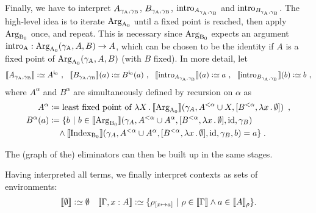 \documentclass{article}
\begin{document}
Finally, we have to interpret $A_{\gamma_{\mathrm{A}}, \gamma_{\mathrm{B}}}$, $B_{\gamma_{\mathrm{A}}, \gamma_{\mathrm{B}}}$,
$\text{intro}_{A_{\gamma_{\mathrm{A}}, \gamma_{\mathrm{B}}}}$ and $\text{intro}_{B_{\gamma_{\mathrm{A}}, \gamma_{\mathrm{B}}}}$.  The high-level
idea is to iterate $\text{Arg}_{\mathrm{A}_0}$ until a fixed point is reached, then apply
$\text{Arg}_{\mathrm{B}_0}$ once, and repeat. This is necessary since $\text{Arg}_{\mathrm{B}_0}$ expects an
argument $\text{intro}_{\mathrm{A}} : \text{Arg}_{\mathrm{A}_0}(\gamma_{\mathrm{A}}, A, B) \to A$, which can be chosen
to be the identity if $A$ is a fixed point of $\text{Arg}_{\mathrm{A}_0}(\gamma_{\mathrm{A}}, A, B)$
(with $B$ fixed). In more detail, let
\begin{gather*}
\sem{A_{\gammaAB}} \colonsimeq A^{\cardz} \enspace\! , \quad\!\!
\sem{B_{\gammaAB}}(a) \colonsimeq B^{\cardz}(a)\enspace\! , \quad\!\!
\sem{\intro{A_{\gammaAB}}}(a) \colonsimeq a \enspace\! ,\quad\!\!
\sem{\intro{B_{\gammaAB}}}(b) \colonsimeq b \enspace\! ,\\
\end{gather*} \vskip -0.5cm \noindent 
where $A^{\alpha}$ and $B^{\alpha}$ are
simultaneously defined by recursion on $\alpha$ as
\begin{align*}
  A^{\alpha} & \coloneqq  \text{least fixed point of }
       \lambda X\,.\, \llbracket \text{Arg}_{\mathrm{A}_0} \rrbracket(\gamma_A, A^{< \alpha} \cup X, [B^{< \alpha}, \lambda x\,.\,\emptyset]) \enspace ,\\
  B^{\alpha}(a) & \coloneqq \{b\ |\ b \in \llbracket \text{Arg}_{\mathrm{B}_0} \rrbracket(\gamma_A, A^{< \alpha} \cup A^{\alpha},
  [B^{< \alpha}, \lambda x\,.\,\emptyset], \text{id}, \gamma_B) \\
  & \quad \land \llbracket \text{Index}_{\mathrm{B}_0} \rrbracket(\gamma_A,
  A^{< \alpha} \cup A^{\alpha}, [B^{< \alpha}, \lambda x\,.\,\emptyset], \text{id}, \gamma_B, b) = a \}\enspace \hspace{-2.47968pt} .
\end{align*}

The (graph of the) eliminators can then be built up in the same
stages.

Having interpreted all terms, we finally interpret contexts as sets of environments:
\begin{align*}
  \llbracket \emptyset \rrbracket \mathrel{\mathop:}\simeq \emptyset && \llbracket \Gamma, x : A \rrbracket \mathrel{\mathop:}\simeq \{
  \rho_{[x \mapsto a]} \ |\ \rho \in \llbracket \Gamma \rrbracket \land a \in \llbracket A \rrbracket_\rho\}.
\end{align*}
\end{document}
